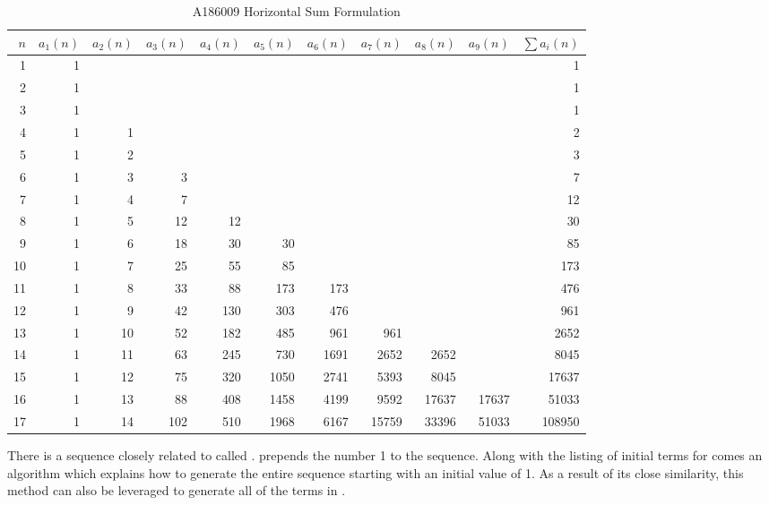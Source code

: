 \documentclass[12pt, oneside]{article}
\numberwithin{equation}{section}
\theoremstyle{definition}
\theoremstyle{plain}
\theoremstyle{remark}
\begin{document}
\begin{table}[htbp]
\centering
\caption{A186009 Horizontal Sum Formulation}
\label{tab:A186009}
\vspace{4pt}
\begin{tabular}{@{}rrrrrrrrrrr@{}}
\toprule
$n$ & $a_1(n)$ & $a_2(n)$ & $a_3(n)$ & $a_4(n)$ & $a_5(n)$ &
$a_6(n)$ & $a_7(n)$ & $a_8(n)$ & $a_9(n)$ & $\sum a_i(n)$ \\
\midrule
1  & 1 &   &   &   &   &   &   &   &   & 1 \\
2  & 1 &   &   &   &   &   &   &   &   & 1 \\
3  & 1 &   &   &   &   &   &   &   &   & 1 \\
4  & 1 & 1 &   &   &   &   &   &   &   & 2 \\
5  & 1 & 2 &   &   &   &   &   &   &   & 3 \\
6  & 1 & 3 & 3 &   &   &   &   &   &   & 7 \\
7  & 1 & 4 & 7 &   &   &   &   &   &   & 12 \\
8  & 1 & 5 & 12 & 12 &   &   &   &   &   & 30 \\
9  & 1 & 6 & 18 & 30 & 30 &   &   &   &   & 85 \\
10 & 1 & 7 & 25 & 55 & 85 &   &   &   &   & 173 \\
11 & 1 & 8 & 33 & 88 & 173 & 173 &   &   &   & 476 \\
12 & 1 & 9 & 42 & 130 & 303 & 476 &   &   &   & 961 \\
13 & 1 & 10 & 52 & 182 & 485 & 961 & 961 &   &   & 2652 \\
14 & 1 & 11 & 63 & 245 & 730 & 1691 & 2652 & 2652 &   & 8045 \\
15 & 1 & 12 & 75 & 320 & 1050 & 2741 & 5393 & 8045 &   & 17637 \\
16 & 1 & 13 & 88 & 408 & 1458 & 4199 & 9592 & 17637 & 17637 & 51033 \\
17 & 1 & 14 & 102 & 510 & 1968 & 6167 & 15759 & 33396 & 51033 & 108950 \\
\bottomrule
\end{tabular}
\end{table}

There is a sequence closely related to  called .  
prepends the number 1 to the  sequence.  Along with the listing of initial
terms for  comes an algorithm which explains how to generate the entire sequence
starting with an initial value of 1.  As a result of its close similarity, this method can
also be leveraged to generate all of the terms in . 
\end{document}
